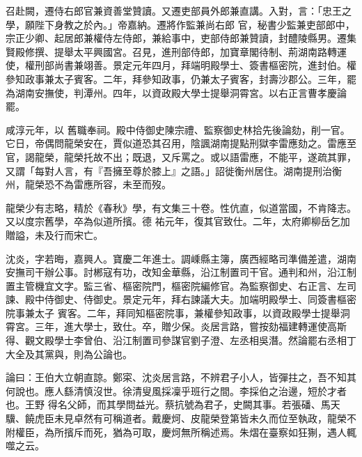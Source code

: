 \begin{pinyinscope}
 召赴闕，遷侍右郎官兼資善堂贊讀。又遷吏部員外郎兼直講。入對，言：「忠王之學，願陛下身教之於內。」帝嘉納。遷將作監兼尚右郎
 官，秘書少監兼吏部郎中，宗正少卿、起居郎兼權侍左侍郎，兼給事中，吏部侍郎兼贊讀，封醴陵縣男。遷集賢殿修撰、提舉太平興國宮。召見，進刑部侍郎，加寶章閣待制、荊湖南路轉運使，權刑部尚書兼翊善。景定元年四月，拜端明殿學士、簽書樞密院，進封伯。權參知政事兼太子賓客。二年，拜參知政事，仍兼太子賓客，封壽沙郡公。三年，罷為湖南安撫使，判潭州。四年，以資政殿大學士提舉洞霄宮。以右正言曹孝慶論罷。



 咸淳元年，以
 舊職奉祠。殿中侍御史陳宗禮、監察御史林拾先後論劾，削一官。它日，帝偶問龍榮安在，賈似道恐其召用，陰諷湖南提點刑獄李雷應劾之。雷應至官，謁龍榮，龍榮托故不出；既退，又斥罵之。或以語雷應，不能平，遂疏其罪，又謂「每對人言，有『吾擁至尊於膝上』之語。」詔徙衡州居住。湖南提刑治衡州，龍榮恐不為雷應所容，未至而歿。



 龍榮少有志略，精於《春秋》學，有文集三十卷。性伉直，似道當國，不肯降志。又以度宗舊學，卒為似道所擯。德
 祐元年，復其官致仕。二年，太府卿柳岳乞加贈謚，未及行而宋亡。



 沈炎，字若晦，嘉興人。寶慶二年進士。調嵊縣主簿，廣西經略司準備差遣，湖南安撫司干辦公事。討郴寇有功，改知金華縣，沿江制置司干官。通判和州，沿江制置主管機宜文字。監三省、樞密院門，樞密院編修官。為監察御史、右正言、左司諫、殿中侍御史、侍御史。景定元年，拜右諫議大夫。加端明殿學士、同簽書樞密院事兼太子
 賓客。二年，拜同知樞密院事，兼權參知政事，以資政殿學士提舉洞霄宮。三年，進大學士，致仕。卒，贈少保。炎居言路，嘗按劾福建轉運使高斯得、觀文殿學士李曾伯、沿江制置司參謀官劉子澄、左丞相吳潛。然論罷右丞相丁大全及其黨與，則為公論也。



 論曰：王伯大立朝直諒。鄭寀、沈炎居言路，不辨君子小人，皆彈拄之，吾不知其何說也。應人繇清慎沒世。徐清叟風採凜乎班行之間。李採伯之治邊，短於才者也。王野
 得名父師，而其學問益光。蔡抗號為君子，史闕其事。若張磻、馬天驥、饒虎臣未見卓然有可稱道者。戴慶炣、皮龍榮登第皆未久而位至執政，龍榮不附權臣，為所擯斥而死，猶為可取，慶炣無所稱述焉。朱熠在臺察如狂猘，遇人輒噬之云。



\end{pinyinscope}